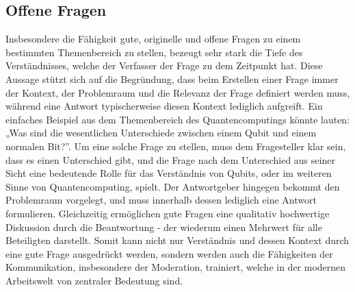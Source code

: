 \subsection{Offene Fragen}
Insbesondere die Fähigkeit gute, originelle und offene Fragen zu einem bestimmten Themenbereich zu stellen, bezeugt sehr stark die Tiefe des Verständnisses, welche der Verfasser der Frage zu dem Zeitpunkt hat. Diese Aussage stützt sich auf die Begründung, dass beim Erstellen einer Frage immer der Kontext, der Problemraum und die Relevanz der Frage definiert werden muss, während eine Antwort typischerweise diesen Kontext lediglich aufgreift. Ein einfaches Beispiel aus dem Themenbereich des Quantencomputings könnte lauten: „Was sind die wesentlichen Unterschiede zwischen einem Qubit und einem normalen Bit?”. Um eine solche Frage zu stellen, muss dem Fragesteller klar sein, dass es einen Unterschied gibt, und die Frage nach dem Unterschied aus seiner Sicht eine bedeutende Rolle für das Verständnis von Qubits, oder im weiteren Sinne von Quantencomputing, spielt. Der Antwortgeber hingegen bekommt den Problemraum vorgelegt, und muss innerhalb dessen lediglich eine Antwort formulieren. Gleichzeitig ermöglichen gute Fragen eine qualitativ hochwertige Diskussion durch die Beantwortung - der wiederum einen Mehrwert für alle Beteiligten darstellt. Somit kann nicht nur Verständnis und dessen Kontext durch eine gute Frage ausgedrückt werden, sondern werden auch die Fähigkeiten der Kommunikation, insbesondere der Moderation, trainiert, welche in der modernen Arbeitswelt von zentraler Bedeutung sind.

